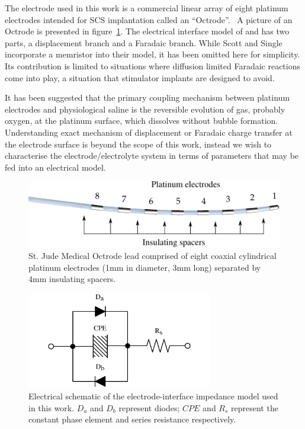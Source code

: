 \documentclass[journal, a4paper]{IEEEtran}
\begin{document}
The electrode used in this work is a commercial linear array of eight platinum electrodes intended for SCS implantation called an ``Octrode''.~\cite{StJudeOctrode} A picture of an Octrode is presented in figure~\ref{fig:octrode}.
The electrical interface model of \cite{Franks2005} and \cite{ScottSingle2013} has two parts, a displacement branch and a Faradaic branch. {\color{blue} While Scott and Single \cite{ScottSingle2013} incorporate a memristor into their model, it has been omitted here for simplicity. Its contribution is limited to situations where diffusion limited Faradaic reactions come into play, a situation that stimulator implants are designed to avoid.}

{
    \color{blue}
It has been suggested that the primary coupling mechanism between platinum electrodes and physiological saline is the reversible evolution of gas, probably oxygen, at the platinum surface, which dissolves without bubble formation.\cite{Greatbatch1969} Understanding exact mechanism of displacement or Faradaic charge transfer at the electrode surface is beyond the scope of this work, instead we wish to characterise the electrode/electrolyte system in terms of parameters that may be fed into an electrical model. 
}

\begin{figure}
    \begin{center}
    \includegraphics{graphics/StJudeOctrodeDiagram}
    \end{center}
    \caption{St. Jude Medical Octrode lead comprised of eight coaxial cylindrical platinum electrodes (1mm in diameter, 3mm long) separated by 4mm insulating spacers.}
    \label{fig:octrode}
\end{figure}

\begin{figure}
    \begin{center}
        \includegraphics[width=230pt]{graphics/interfaceSchematic_noMemristive}
    \end{center}
    \caption{Electrical schematic of the electrode-interface impedance model used in this work. $D_{a}$ and $D_{b}$ represent diodes; $CPE$ and $R_{s}$ represent the constant phase element and series resistance respectively.}
    \label{fig:schematic}
\end{figure}
\end{document}
